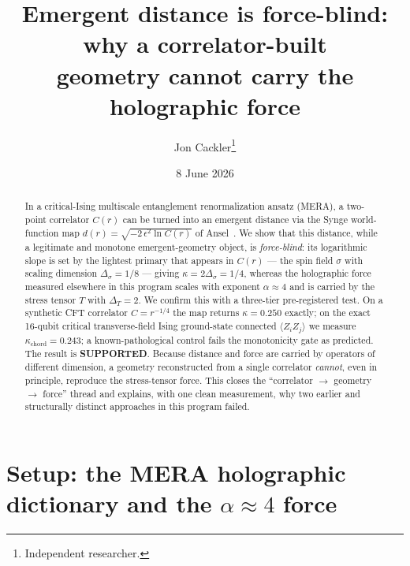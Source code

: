 \documentclass[11pt]{article}
\title{Emergent distance is force-blind: why a correlator-built\\
geometry cannot carry the holographic force}
\author{Jon Cackler\thanks{Independent researcher.}}
\date{8 June 2026}
\begin{document}
\maketitle

\noindent{}
\medskip

\begin{abstract}
In a critical-Ising multiscale entanglement renormalization ansatz (MERA), a two-point
correlator $C(r)$ can be turned into an emergent distance via the Synge world-function map
$d(r)=\sqrt{-2\,\epsilon^{2}\ln C(r)}$ of Ansel~\cite{Ansel2024}. We show that this distance,
while a legitimate and monotone emergent-geometry object, is \emph{force-blind}: its
logarithmic slope is set by the lightest primary that appears in $C(r)$ --- the spin field
$\sigma$ with scaling dimension $\Delta_\sigma=1/8$ --- giving $\kappa=2\Delta_\sigma=1/4$,
whereas the holographic force measured elsewhere in this program scales with exponent
$\alpha\approx4$ and is carried by the stress tensor $T$ with $\Delta_T=2$. We confirm this
with a three-tier pre-registered test. On a synthetic CFT correlator $C=r^{-1/4}$ the map
returns $\kappa=0.250$ exactly; on the exact 16-qubit critical transverse-field Ising
ground-state connected $\langle Z_iZ_j\rangle$ we measure $\kappa_{\mathrm{chord}}=0.243$;
a known-pathological control fails the monotonicity gate as predicted. The result is
\textbf{SUPPORTED}. Because distance and force are carried by operators of different
dimension, a geometry reconstructed from a single correlator \emph{cannot}, even in
principle, reproduce the stress-tensor force. This closes the
``correlator $\to$ geometry $\to$ force'' thread and explains, with one clean measurement,
why two earlier and structurally distinct approaches in this program failed.
\end{abstract}

\section{Setup: the MERA holographic dictionary and the \texorpdfstring{$\alpha\approx4$}{alpha=4} force}
\label{sec:setup}
\end{document}
